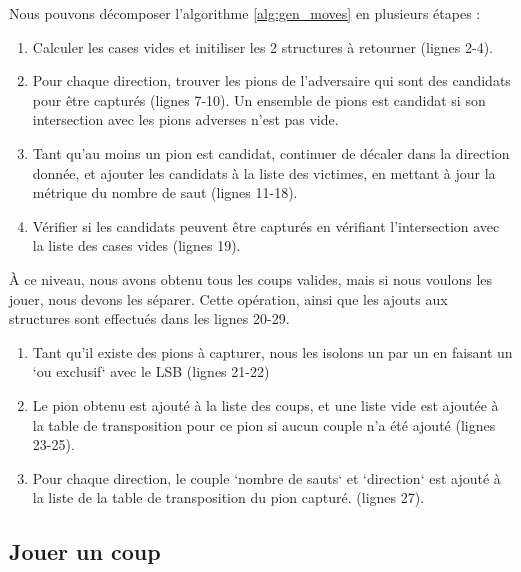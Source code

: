 Nous pouvons décomposer l'algorithme \ref{alg:gen_moves} en plusieurs étapes :
\begin{enumerate}
    \item Calculer les cases vides et initiliser les 2 structures à retourner (lignes 2-4).
    \item Pour chaque direction, trouver les pions de l'adversaire qui sont des candidats pour être capturés (lignes 7-10). Un ensemble de pions est candidat si son intersection avec les pions adverses n'est pas vide.
    \item Tant qu'au moins un pion est candidat, continuer de décaler dans la direction donnée, et ajouter les candidats à la liste des victimes, en mettant à jour la métrique du nombre de saut (lignes 11-18).
    \item Vérifier si les candidats peuvent être capturés en vérifiant l'intersection avec la liste des cases vides (lignes 19).
\end{enumerate}
À ce niveau, nous avons obtenu tous les coups valides, mais si nous voulons les jouer, nous devons les séparer. Cette opération, ainsi que les ajouts aux structures sont effectués dans les lignes 20-29.
\begin{enumerate}
    \item Tant qu'il existe des pions à capturer, nous les isolons un par un en faisant un `ou exclusif` avec le \ac{LSB} (lignes 21-22)
    \item Le pion obtenu est ajouté à la liste des coups, et une liste vide est ajoutée à la table de transposition pour ce pion si aucun couple n'a été ajouté (lignes 23-25).
    \item Pour chaque direction, le couple `nombre de sauts` et `direction` est ajouté à la liste de la table de transposition du pion capturé. (lignes 27).
\end{enumerate}

\subsection{Jouer un coup}
\label{subsec:play}

